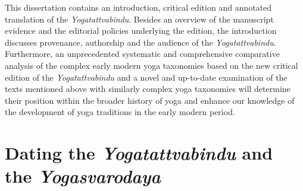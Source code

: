 This dissertation contains an introduction, critical edition and annotated translation of the \textit{Yogatattvabindu}. Besides an overview of the manuscript evidence and the editorial policies underlying the edition, the introduction discusses provenance, authorship and the audience of the \textit{Yogatattvabindu}. Furthermore, an unprecedented systematic and comprehensive comparative analysis of the complex early modern yoga taxonomies based on the new critical edition of the \textit{Yogatattvabindu} and a novel and up-to-date examination of the texts mentioned above with similarly complex yoga taxonomies will determine their position within the broader history of yoga and enhance our knowledge of the development of yoga traditions in the early modern period.

\section{Dating the \textit{Yogatattvabindu} and the \emph{Yogasvarodaya}}
\label{dating}
